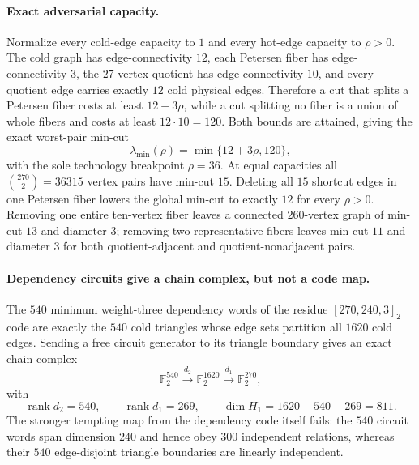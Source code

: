 \paragraph{Exact adversarial capacity.}
Normalize every cold-edge capacity to $1$ and every hot-edge capacity to $\rho>0$.  The cold graph has edge-connectivity $12$, each Petersen fiber has edge-connectivity $3$, the $27$-vertex quotient has edge-connectivity $10$, and every quotient edge carries exactly $12$ cold physical edges.  Therefore a cut that splits a Petersen fiber costs at least $12+3\rho$, while a cut splitting no fiber is a union of whole fibers and costs at least $12\cdot10=120$.  Both bounds are attained, giving the exact worst-pair min-cut
\[
  \lambda_{\min}(\rho)=\min\{12+3\rho,120\},
\]
with the sole technology breakpoint $\rho=36$.  At equal capacities all $\binom{270}{2}=36315$ vertex pairs have min-cut $15$.  Deleting all $15$ shortcut edges in one Petersen fiber lowers the global min-cut to exactly $12$ for every $\rho>0$.  Removing one entire ten-vertex fiber leaves a connected $260$-vertex graph of min-cut $13$ and diameter $3$; removing two representative fibers leaves min-cut $11$ and diameter $3$ for both quotient-adjacent and quotient-nonadjacent pairs.

\paragraph{Dependency circuits give a chain complex, but not a code map.}
The $540$ minimum weight-three dependency words of the residue $[270,240,3]_2$ code are exactly the $540$ cold triangles whose edge sets partition all $1620$ cold edges.  Sending a free circuit generator to its triangle boundary gives an exact chain complex
\[
  \mathbb F_2^{540}\xrightarrow{d_2}\mathbb F_2^{1620}
  \xrightarrow{d_1}\mathbb F_2^{270},
\]
with
\[
  \operatorname{rank}d_2=540,\qquad \operatorname{rank}d_1=269,\qquad
  \dim H_1=1620-540-269=811.
\]
The stronger tempting map from the dependency code itself fails: the $540$ circuit words span dimension $240$ and hence obey $300$ independent relations, whereas their $540$ edge-disjoint triangle boundaries are linearly independent.

